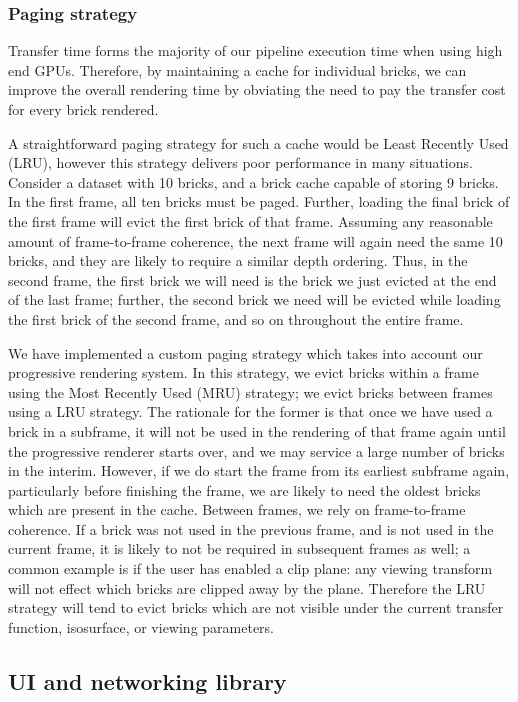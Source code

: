 \subsubsection{Paging strategy}

Transfer time forms the majority of our pipeline execution
time when using high end GPUs. Therefore, by maintaining
a cache for individual bricks, we can improve the overall
rendering time by obviating the need to pay the transfer cost
for every brick rendered.

A straightforward paging strategy for such a cache would
be Least Recently Used (LRU), however this strategy delivers
poor performance in many situations. Consider a dataset
with 10 bricks, and a brick cache capable of storing 9 bricks.
In the first frame, all ten bricks must be paged. Further, loading
the final brick of the first frame will evict the first brick
of that frame. Assuming any reasonable amount of frame-to-frame
coherence, the next frame will again need the same 10
bricks, and they are likely to require a similar depth ordering.
Thus, in the second frame, the first brick we will need
is the brick we just evicted at the end of the last frame; further,
the second brick we need will be evicted while loading
the first brick of the second frame, and so on throughout the
entire frame.

We have implemented a custom paging strategy which
takes into account our progressive rendering system. In this
strategy, we evict bricks within a frame using the Most Recently
Used (MRU) strategy; we evict bricks between frames
using a LRU strategy. The rationale for the former is that
once we have used a brick in a subframe, it will not be
used in the rendering of that frame again until the progressive
renderer starts over, and we may service a large number
of bricks in the interim. However, if we do start the frame
from its earliest subframe again, particularly before finishing
the frame, we are likely to need the oldest bricks which
are present in the cache. Between frames, we rely on frame-to-frame
coherence. If a brick was not used in the previous
frame, and is not used in the current frame, it is likely to not
be required in subsequent frames as well; a common example
is if the user has enabled a clip plane: any viewing transform
will not effect which bricks are clipped away by the
plane. Therefore the LRU strategy will tend to evict bricks
which are not visible under the current transfer function, isosurface,
or viewing parameters.

\subsection{UI and networking library}

